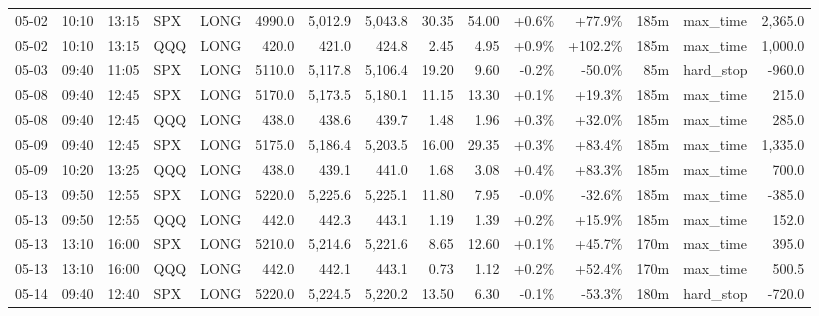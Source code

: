 \documentclass[11pt,a4paper,twoside]{article}
\begin{document}
\begin{landscape}
\begin{center}
\begin{longtable}{>{\color{txtmain}}l l l l l r r r r r r r r >{\color{txtmain}}l r}
05-02 & 10:10 & 13:15 & SPX & LONG & 4990.0 & 5,012.9 & 5,043.8 & 30.35 & 54.00 & \textcolor{wingreen}{+0.6\%} & \textcolor{wingreen}{+77.9\%} & 185m & max\_time & \textcolor{wingreen}{2,365.0} \\
05-02 & 10:10 & 13:15 & QQQ & LONG & 420.0 & 421.0 & 424.8 & 2.45 & 4.95 & \textcolor{wingreen}{+0.9\%} & \textcolor{wingreen}{+102.2\%} & 185m & max\_time & \textcolor{wingreen}{1,000.0} \\
05-03 & 09:40 & 11:05 & SPX & LONG & 5110.0 & 5,117.8 & 5,106.4 & 19.20 & 9.60 & \textcolor{lossred}{-0.2\%} & \textcolor{lossred}{-50.0\%} & 85m & hard\_stop & \textcolor{lossred}{-960.0} \\
05-08 & 09:40 & 12:45 & SPX & LONG & 5170.0 & 5,173.5 & 5,180.1 & 11.15 & 13.30 & \textcolor{wingreen}{+0.1\%} & \textcolor{wingreen}{+19.3\%} & 185m & max\_time & \textcolor{wingreen}{215.0} \\
05-08 & 09:40 & 12:45 & QQQ & LONG & 438.0 & 438.6 & 439.7 & 1.48 & 1.96 & \textcolor{wingreen}{+0.3\%} & \textcolor{wingreen}{+32.0\%} & 185m & max\_time & \textcolor{wingreen}{285.0} \\
05-09 & 09:40 & 12:45 & SPX & LONG & 5175.0 & 5,186.4 & 5,203.5 & 16.00 & 29.35 & \textcolor{wingreen}{+0.3\%} & \textcolor{wingreen}{+83.4\%} & 185m & max\_time & \textcolor{wingreen}{1,335.0} \\
05-09 & 10:20 & 13:25 & QQQ & LONG & 438.0 & 439.1 & 441.0 & 1.68 & 3.08 & \textcolor{wingreen}{+0.4\%} & \textcolor{wingreen}{+83.3\%} & 185m & max\_time & \textcolor{wingreen}{700.0} \\
05-13 & 09:50 & 12:55 & SPX & LONG & 5220.0 & 5,225.6 & 5,225.1 & 11.80 & 7.95 & \textcolor{lossred}{-0.0\%} & \textcolor{lossred}{-32.6\%} & 185m & max\_time & \textcolor{lossred}{-385.0} \\
05-13 & 09:50 & 12:55 & QQQ & LONG & 442.0 & 442.3 & 443.1 & 1.19 & 1.39 & \textcolor{wingreen}{+0.2\%} & \textcolor{wingreen}{+15.9\%} & 185m & max\_time & \textcolor{wingreen}{152.0} \\
05-13 & 13:10 & 16:00 & SPX & LONG & 5210.0 & 5,214.6 & 5,221.6 & 8.65 & 12.60 & \textcolor{wingreen}{+0.1\%} & \textcolor{wingreen}{+45.7\%} & 170m & max\_time & \textcolor{wingreen}{395.0} \\
05-13 & 13:10 & 16:00 & QQQ & LONG & 442.0 & 442.1 & 443.1 & 0.73 & 1.12 & \textcolor{wingreen}{+0.2\%} & \textcolor{wingreen}{+52.4\%} & 170m & max\_time & \textcolor{wingreen}{500.5} \\
05-14 & 09:40 & 12:40 & SPX & LONG & 5220.0 & 5,224.5 & 5,220.2 & 13.50 & 6.30 & \textcolor{lossred}{-0.1\%} & \textcolor{lossred}{-53.3\%} & 180m & hard\_stop & \textcolor{lossred}{-720.0} \\

\end{longtable}
\end{center}
\end{landscape}
\end{document}
